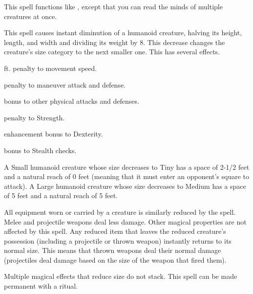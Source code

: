 \begin{spelleffect}
    This spell functions like , except that you can read the minds of multiple creatures at once. 
\end{spelleffect}

\spellrng{\rngclose}
\begin{spelleffect}
  This spell causes instant diminution of a humanoid creature, halving its height, length, and width and dividing its weight by 8. This decrease changes the creature's size category to the next smaller one. This has several effects.
  \begin{itemize*} 
    \item {} ft. penalty to movement speed.
    \item {} penalty to maneuver attack and defense.
    \item {} bonus to other physical attacks and defenses.
    \item {} penalty to Strength.
    \item {} enhancement bonus to Dexterity.
    \item {} bonus to Stealth checks.
  \end{itemize*}
  \par A Small humanoid creature whose size decreases to Tiny has a space of 2-1/2 feet and a natural reach of 0 feet (meaning that it must enter an opponent's square to attack). A Large humanoid creature whose size decreases to Medium has a space of 5 feet and a natural reach of 5 feet.
  \par All equipment worn or carried by a creature is similarly reduced by the spell. Melee and projectile weapons deal less damage. Other magical properties are not affected by this spell. Any reduced item that leaves the reduced creature's possession (including a projectile or thrown weapon) instantly returns to its normal size. This means that thrown weapons deal their normal damage (projectiles deal damage based on the size of the weapon that fired them).
\end{spelleffect}
\begin{spellnotes}
  Multiple magical effects that reduce size do not stack. This spell can be made permanent with a  ritual.
\end{spellnotes}

